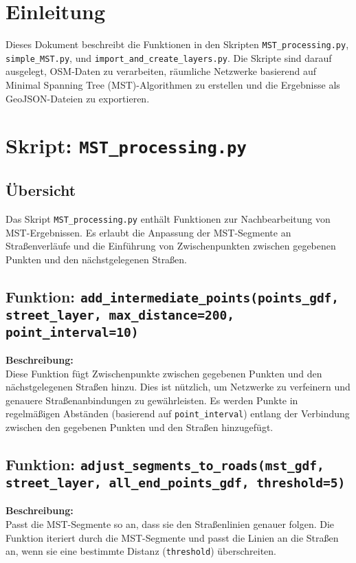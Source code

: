 \section{Einleitung}
Dieses Dokument beschreibt die Funktionen in den Skripten \texttt{MST\_processing.py}, \texttt{simple\_MST.py}, und \texttt{import\_and\_create\_layers.py}. Die Skripte sind darauf ausgelegt, OSM-Daten zu verarbeiten, räumliche Netzwerke basierend auf Minimal Spanning Tree (MST)-Algorithmen zu erstellen und die Ergebnisse als GeoJSON-Dateien zu exportieren.

\section{Skript: \texttt{MST\_processing.py}}

\subsection{Übersicht}
Das Skript \texttt{MST\_processing.py} enthält Funktionen zur Nachbearbeitung von MST-Ergebnissen. Es erlaubt die Anpassung der MST-Segmente an Straßenverläufe und die Einführung von Zwischenpunkten zwischen gegebenen Punkten und den nächstgelegenen Straßen.

\subsection{Funktion: \texttt{add\_intermediate\_points(points\_gdf, street\_layer, max\_distance=200, point\_interval=10)}}
\textbf{Beschreibung:}\\
Diese Funktion fügt Zwischenpunkte zwischen gegebenen Punkten und den nächstgelegenen Straßen hinzu. Dies ist nützlich, um Netzwerke zu verfeinern und genauere Straßenanbindungen zu gewährleisten. Es werden Punkte in regelmäßigen Abständen (basierend auf \texttt{point\_interval}) entlang der Verbindung zwischen den gegebenen Punkten und den Straßen hinzugefügt.

\subsection{Funktion: \texttt{adjust\_segments\_to\_roads(mst\_gdf, street\_layer, all\_end\_points\_gdf, threshold=5)}}
\textbf{Beschreibung:}\\
Passt die MST-Segmente so an, dass sie den Straßenlinien genauer folgen. Die Funktion iteriert durch die MST-Segmente und passt die Linien an die Straßen an, wenn sie eine bestimmte Distanz (\texttt{threshold}) überschreiten.

